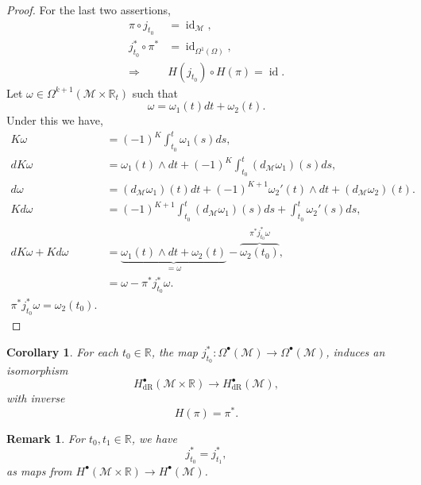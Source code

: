 \documentclass[8pt]{article}
\newtheorem{remark}{Remark}[section]
\newtheorem{corollary}{Corollary} [section]
\DeclareMathOperator{\id}{id}
\DeclareMathOperator{\dR}{dR}
\newcommand{\R}[0]{\mathbb{R}}
\newcommand{\M}[0]{\mathcal{M}}
\begin{document}
\begin{proof}
For the last two assertions,
\begin{align*}
  \pi\circ j_{t_0}&=\id_\M,\\
  j^*_{t_0}\circ\pi^*  &= \id_{\Omega^1(\Omega)},\\
  \Rightarrow & H(j_{t_0})\circ H(\pi) = \id.
\end{align*}
Let $\omega\in\Omega^{k+1}(\M\times\R_{t})$ such that 
\begin{equation*}
  \omega = \omega_1(t)dt+\omega_2(t).
\end{equation*}
Under this we have,
\begin{align*}
  K\omega &= (-1)^K\int_{t_0}^t\omega_1(s)ds,\\
  dK\omega &= \omega_1(t)\wedge dt +(-1)^K\int_{t_0}^t (d_\M\omega_1)(s)ds,\\
  d\omega & = (d_\M\omega_1)(t)dt + (-1)^{K+1}\omega_2'(t)\wedge dt+(d_\M\omega_2)(t).\\
  Kd\omega & = (-1)^{K+1}\int_{t_0}^t (d_\M \omega_1)(s)ds + \int_{t_0}^t \omega_2'(s)ds,\\
  dK\omega+Kd\omega & = \underbrace{\omega_1(t)\wedge dt+\omega_2(t)}_{=\omega}-\overbrace{\omega_2(t_0)}^{\pi^*j_{t_0}^*\omega},\\
  & = \omega-\pi^* j_{t_0}^*\omega.\\
  \pi^*j_{t_0}^*\omega = \omega_2(t_0).
\end{align*}
\end{proof}

\begin{corollary}
  For each $t_0\in\R$, the map $j_{t_0}^*:\Omega^\bullet(\M)\to\Omega^\bullet(\M)$, induces an isomorphism 
  \begin{equation*}
    H_{\dR}^\bullet(\M\times\R)\to H_{\dR}^\bullet(\M),
  \end{equation*}
  with inverse  
  \begin{equation*}
    H(\pi) = \pi^*.
  \end{equation*}
\end{corollary}

\begin{remark}
  For $t_0,t_1\in\R$, we have 
  \begin{equation*}
    j_{t_0}^*=j_{t_1}^*,
  \end{equation*}
  as maps from $H^\bullet(\M\times\R)\to H^\bullet(\M)$.
\end{remark}
\end{document}

